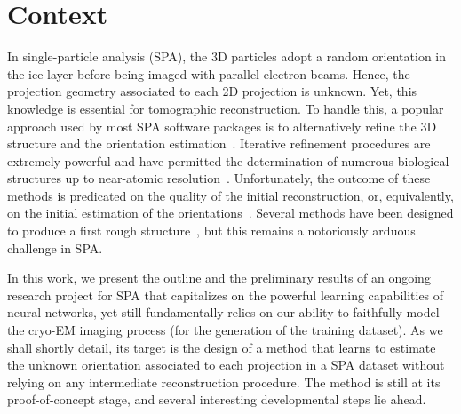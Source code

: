 \section{Context}
\label{sec:context}

In single-particle analysis (SPA), the 3D particles adopt a random orientation in the ice layer before being imaged with parallel electron beams. Hence, the projection geometry associated to each 2D projection is unknown. Yet, this knowledge is essential for tomographic reconstruction. To handle this, a popular approach used by most SPA software packages is to alternatively refine the 3D structure and the orientation estimation~\cite{penczek1994ribosome,Baker1996,Dempster1977,sigworth1998maximum,scheres2012bayesian}. Iterative refinement procedures are extremely powerful and have permitted the determination of numerous biological structures up to near-atomic resolution~\cite{kuhlbrandt2014resolution}. Unfortunately, the outcome of these methods is predicated on the quality of the initial reconstruction, or, equivalently, on the initial estimation of the orientations~\cite{sorzano2006optimization,henderson2012outcome}. Several methods have been designed to produce a first rough structure~\cite{singer2010detecting,wang2013orientation,greenberg2017common,punjani2017cryosparc,pragier2019common}, but this remains a notoriously arduous challenge in SPA.  

In this work, we present the outline and the preliminary results of an ongoing research project for SPA that capitalizes on the powerful learning capabilities of neural networks, yet still fundamentally relies on our ability to faithfully model the cryo-EM imaging process (for the generation of the training dataset). As we shall shortly detail, its target is the design of a method that learns to estimate the unknown orientation associated to each projection in a SPA dataset without relying on any intermediate reconstruction procedure. The method is still at its proof-of-concept stage, and several interesting developmental steps lie ahead.
